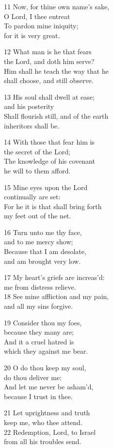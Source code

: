 11 Now, for thine own name’s sake,\\
O Lord, I thee entreat\\
To pardon mine iniquity;\\
for it is very great.

12 What man is he that fears\\
the Lord, and doth him serve?\\
Him shall he teach the way that he\\
shall choose, and still observe.

13 His soul shall dwell at ease;\\
and his posterity\\
Shall flourish still, and of the earth\\
inheritors shall be.

14 With those that fear him is\\
the secret of the Lord;\\
The knowledge of his covenant\\
he will to them afford.

15 Mine eyes upon the Lord\\
continually are set:\\
For he it is that shall bring forth\\
my feet out of the net.

16 Turn unto me thy face,\\
and to me mercy show;\\
Because that I am desolate,\\
and am brought very low.

17 My heart’s griefs are increas’d:\\
me from distress relieve.\\
18 See mine affliction and my pain,\\
and all my sins forgive.

19 Consider thou my foes,\\
because they many are;\\
And it a cruel hatred is\\
which they against me bear.

20 O do thou keep my soul,\\
do thou deliver me:\\
And let me never be asham’d,\\
because I trust in thee.

21 Let uprightness and truth\\
keep me, who thee attend.\\
22 Redemption, Lord, to Israel\\
from all his troubles send.

